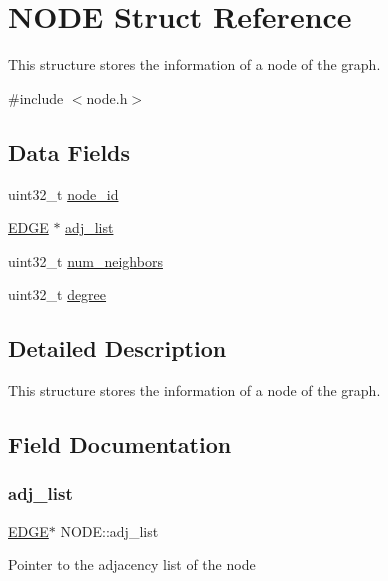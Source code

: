 \hypertarget{structNODE}{}\section{N\+O\+DE Struct Reference}
\label{structNODE}


This structure stores the information of a node of the graph.  




{\ttfamily \#include $<$node.\+h$>$}

\subsection*{Data Fields}
\begin{DoxyCompactItemize}
\item 
uint32\+\_\+t \hyperlink{structNODE_a5a4598006a4940d545ec4e8fda905826}{node\+\_\+id}
\item 
\hyperlink{edge_8h_ab4a642fc78a44ca8df119570b3288e13}{E\+D\+GE} $\ast$ \hyperlink{structNODE_ad3a6a918ba95f3ac9f897738ee2675e1}{adj\+\_\+list}
\item 
uint32\+\_\+t \hyperlink{structNODE_a34195e71189dd8b3b5d9988f0ad9416a}{num\+\_\+neighbors}
\item 
uint32\+\_\+t \hyperlink{structNODE_a0a2073821a4fe78d9700b75047328cd5}{degree}
\end{DoxyCompactItemize}


\subsection{Detailed Description}
This structure stores the information of a node of the graph. 

\subsection{Field Documentation}
\mbox{\label{structNODE_ad3a6a918ba95f3ac9f897738ee2675e1}} 
\subsubsection{\texorpdfstring{adj\+\_\+list}{adj\_list}}
{\footnotesize\ttfamily \hyperlink{edge_8h_ab4a642fc78a44ca8df119570b3288e13}{E\+D\+GE}$\ast$ N\+O\+D\+E\+::adj\+\_\+list}

Pointer to the adjacency list of the node \mbox{\label{structNODE_a0a2073821a4fe78d9700b75047328cd5}} 
